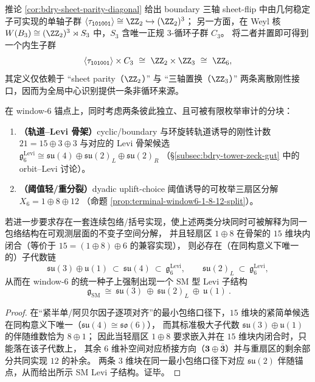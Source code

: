 \begin{remark}\label{rem:bdry-intrinsic-z6-diagz2-c3}
推论 \ref{cor:bdry-sheet-parity-diagonal} 给出 boundary 三轴 sheet-flip 中由几何稳定子可实现的单轴子群
\(
\langle\tau_{\texttt{101001}}\rangle\cong\ZZ_2\hookrightarrow (\ZZ_2)^3
\)；
另一方面，在 Weyl 核 \(W(B_3)\cong (\ZZ_2)^3\rtimes S_3\) 中，\(S_3\) 含唯一正规 \(3\)-循环子群 \(C_3\)。
将二者并置即可得到一个内生子群
\[
\langle\tau_{\texttt{101001}}\rangle\times C_3\ \cong\ \ZZ_2\times\ZZ_3\ \cong\ \ZZ_6,
\]
其定义仅依赖于 “sheet parity（\(\ZZ_2\)）” 与 “三轴置换（\(\ZZ_3\)）” 两条离散刚性接口，因而为全局中心识别提供一条非循环来源。
\end{remark}

\begin{proposition}\label{prop:window6-common-refinement-sm-levi}
在 window-\(6\) 锚点上，同时考虑两条彼此独立、且可被有限枚举审计的分块：
\begin{enumerate}
  \item \textbf{（轨道--Levi 骨架）}cyclic/boundary 与环旋转轨道诱导的刚性计数
  \(
  21=15\oplus 3\oplus 3
  \)
  与对应的 Levi 骨架候选
  \(
  \mathfrak g_6^{\mathrm{Levi}}\cong \mathfrak{su}(4)\oplus\mathfrak{su}(2)_L\oplus\mathfrak{su}(2)_R
  \)
  （\S\ref{subsec:bdry-tower-zeck-gut} 中的 orbit--Levi 讨论）。
  \item \textbf{（阈值轻/重分裂）}dyadic uplift-choice 阈值诱导的可枚举三扇区分解
  \(
  X_6=1\oplus 8\oplus 12
  \)
  （命题 \ref{prop:terminal-window6-1-8-12-split}）。
\end{enumerate}
若进一步要求存在一套连续包络/括号实现，使上述两类分块同时可被解释为同一包络结构在可观测层面的不变子空间分解，
并且轻扇区 \(1\oplus 8\) 在骨架的 \(15\) 维块内闭合（等价于 \(15=(1\oplus 8)\oplus 6\) 的兼容实现），
则必存在（在同构意义下唯一的）子代数链
\[
\mathfrak{su}(3)\oplus\mathfrak u(1)\ \subset\ \mathfrak{su}(4)\ \subset\ \mathfrak g_6^{\mathrm{Levi}},
\qquad
\mathfrak{su}(2)_L\ \subset\ \mathfrak g_6^{\mathrm{Levi}},
\]
从而在 window-\(6\) 的统一种子上强制出现一个 SM 型 Levi 子结构
\[
\boxed{\ \mathfrak g_{\mathrm{SM}}\ \cong\ \mathfrak{su}(3)\ \oplus\ \mathfrak{su}(2)_L\ \oplus\ \mathfrak u(1)\ }.
\]
\end{proposition}
\begin{proof}
在“紧半单/阿贝尔因子逐项对齐”的最小包络口径下，\(15\) 维块的紧简单候选在同构意义下唯一（\(\mathfrak{su}(4)\cong\mathfrak{so}(6)\)），
而其标准极大子代数 \(\mathfrak{su}(3)\oplus\mathfrak u(1)\) 的伴随维数恰为 \(8\oplus 1\)；
因此当轻扇区 \(1\oplus 8\) 要求嵌入并在 \(15\) 维块内闭合时，只能落在该子代数上，
其余 \(6\) 维补空间对应桥接方向（\(\mathbf3\oplus\bar{\mathbf3}\)）并与重扇区的剩余部分共同实现 \(12\) 的补余。
两条 \(3\) 维块在同一最小包络口径下对应 \(\mathfrak{su}(2)\) 伴随锚点，从而给出所示 SM Levi 子结构。证毕。
\end{proof}


